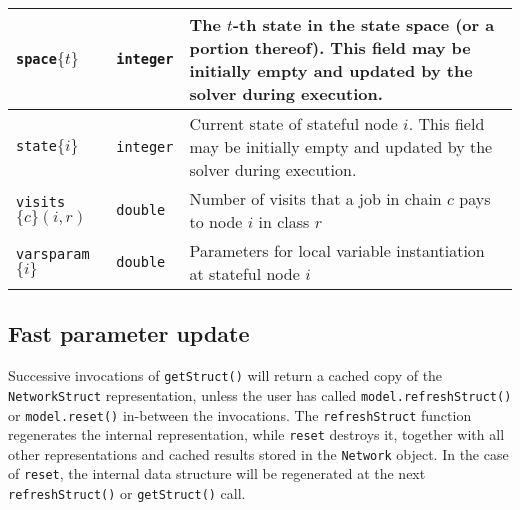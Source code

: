 \begin{table}[thbp]
{\begin{tabular}{|l|l|p{9.5cm}|}
\texttt{space}$\{t\}$  & \texttt{integer} & The $t$-th state in the state space (or a portion thereof). This field may be initially empty and updated by the solver during execution.\\\hline
\texttt{state}$\{i\}$ & \texttt{integer} & Current state of stateful node $i$. This field may be initially empty and updated by the solver during execution.\\\hline
\texttt{visits}$\{c\}(i,r)$  & \texttt{double} & Number of visits that a job in chain $c$ pays to node $i$ in class $r$\\\hline
\texttt{varsparam}$\{i\}$  & \texttt{double} & Parameters for local variable instantiation at stateful node $i$\\
\hline
\end{tabular}
}
\label{TAB_QN}
\end{table}
\subsection{Fast parameter update}
Successive invocations of \texttt{getStruct()} will return a cached copy of the \texttt{NetworkStruct} representation, unless the user has called \texttt{model.refreshStruct()} or \texttt{model.reset()} in-between the invocations. The \texttt{refreshStruct} function regenerates the internal representation, while \texttt{reset} destroys it, together with all other representations and cached results stored in the \texttt{Network} object. In the case of \texttt{reset}, the internal data structure will be regenerated at the next \texttt{refreshStruct()} or \texttt{getStruct()} call.

